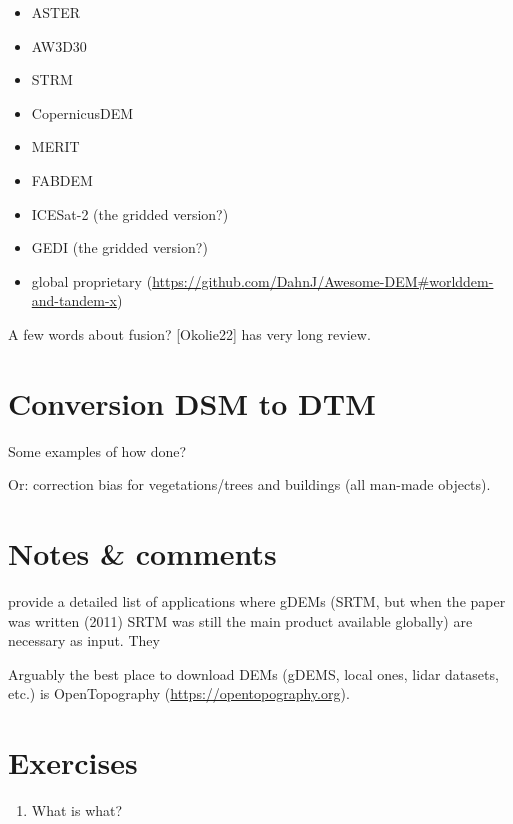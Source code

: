 \begin{itemize}
  \item ASTER
  \item AW3D30
  \item STRM
  \item CopernicusDEM
  \item MERIT
  \item FABDEM
  \item ICESat-2 (the gridded version?)
  \item GEDI (the gridded version?)
  \item global proprietary (\url{https://github.com/DahnJ/Awesome-DEM#worlddem-and-tandem-x})
\end{itemize}

A few words about fusion? [Okolie22] has very long review.


%
\section{Conversion DSM to DTM}

Some examples of how done?

Or: correction bias for vegetations/trees and buildings (all man-made objects).

%
\section{Notes \& comments}

\citet{Yang11} provide a detailed list of applications where gDEMs (SRTM, but when the paper was written (2011) SRTM was still the main product available globally) are necessary as input.
They 

Arguably the best place to download DEMs (gDEMS, local ones, lidar datasets, etc.) is OpenTopography (\url{https://opentopography.org}).




%
\section{Exercises}

\begin{enumerate}
  \item What is what?
\end{enumerate}
